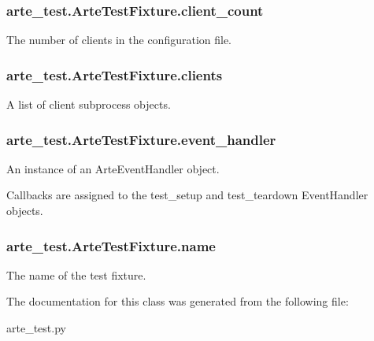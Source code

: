 \subsubsection[{client\+\_\+count}]{\setlength{\rightskip}{0pt plus 5cm}arte\+\_\+test.\+Arte\+Test\+Fixture.\+client\+\_\+count}\label{classarte__test_1_1_arte_test_fixture_ac02585f8f6c1fa8cae84ac394002bc84}


The number of clients in the configuration file. 

\subsubsection[{clients}]{\setlength{\rightskip}{0pt plus 5cm}arte\+\_\+test.\+Arte\+Test\+Fixture.\+clients}\label{classarte__test_1_1_arte_test_fixture_a0ce25bc979d417989f0ae2d4d30e828b}


A list of client subprocess objects. 

\subsubsection[{event\+\_\+handler}]{\setlength{\rightskip}{0pt plus 5cm}arte\+\_\+test.\+Arte\+Test\+Fixture.\+event\+\_\+handler}\label{classarte__test_1_1_arte_test_fixture_acbd27814c30171ebeb3bc3b0dd2d7978}


An instance of an Arte\+Event\+Handler object. 

Callbacks are assigned to the test\+\_\+setup and test\+\_\+teardown Event\+Handler objects. 
\subsubsection[{name}]{\setlength{\rightskip}{0pt plus 5cm}arte\+\_\+test.\+Arte\+Test\+Fixture.\+name}\label{classarte__test_1_1_arte_test_fixture_abe682da10ac998fb93aa256004362abb}


The name of the test fixture. 



The documentation for this class was generated from the following file\+:\begin{DoxyCompactItemize}
\item 
arte\+\_\+test.\+py\end{DoxyCompactItemize}

